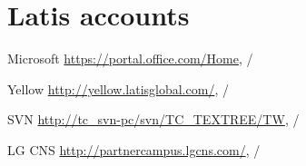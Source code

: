\documentclass{hzguide}
\begin{document}
\section{Latis accounts}

\begin{terms}
\item[Microsoft] ​\url{https://portal.office.com/Home},  / 
\item[Yellow] \url{http://yellow.latisglobal.com/},  / 
\item[SVN] \url{http://tc_svn-pc/svn/TC_TEXTREE/TW},  / 
\item[LG CNS] \url{http://partnercampus.lgcns.com/},  / 
\end{terms}
\end{document}
